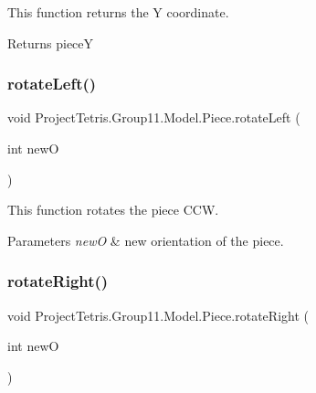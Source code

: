 This function returns the Y coordinate. 

\begin{DoxyReturn}{Returns}
pieceY 
\end{DoxyReturn}
\hypertarget{class_project_tetris_1_1_group11_1_1_model_1_1_piece_a49a8a87f2d7265970cda241bb0740106}{}\label{class_project_tetris_1_1_group11_1_1_model_1_1_piece_a49a8a87f2d7265970cda241bb0740106} 
\subsubsection{\texorpdfstring{rotate\+Left()}{rotateLeft()}}
{\footnotesize\ttfamily void Project\+Tetris.\+Group11.\+Model.\+Piece.\+rotate\+Left (\begin{DoxyParamCaption}\item[{int}]{newO }\end{DoxyParamCaption})}



This function rotates the piece C\+CW. 


\begin{DoxyParams}{Parameters}
{\em newO} & new orientation of the piece. \\
\hline
\end{DoxyParams}
\hypertarget{class_project_tetris_1_1_group11_1_1_model_1_1_piece_a9ec88cace1726a50873efb97a8ec84fb}{}\label{class_project_tetris_1_1_group11_1_1_model_1_1_piece_a9ec88cace1726a50873efb97a8ec84fb} 
\subsubsection{\texorpdfstring{rotate\+Right()}{rotateRight()}}
{\footnotesize\ttfamily void Project\+Tetris.\+Group11.\+Model.\+Piece.\+rotate\+Right (\begin{DoxyParamCaption}\item[{int}]{newO }\end{DoxyParamCaption})}



